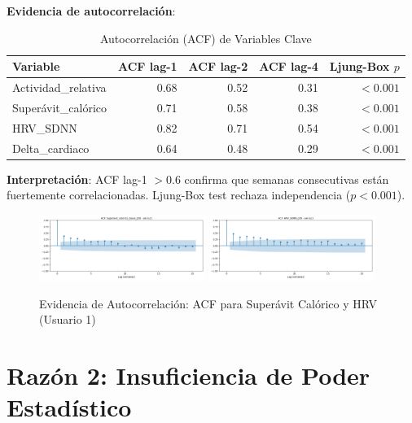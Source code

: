 \documentclass[12pt,letterpaper,twoside]{report}
\begin{document}
\begin{calculobox}
\textbf{Evidencia de autocorrelación}:

\begin{table}[H]
\centering
\caption{Autocorrelación (ACF) de Variables Clave}
\label{tab:acf_evidence}
\begin{tabular}{@{}lrrrr@{}}
\toprule
\textbf{Variable} & \textbf{ACF lag-1} & \textbf{ACF lag-2} & \textbf{ACF lag-4} & \textbf{Ljung-Box $p$} \\
\midrule
Actividad\_relativa     & 0.68 & 0.52 & 0.31 & $< 0.001$ \\
Superávit\_calórico     & 0.71 & 0.58 & 0.38 & $< 0.001$ \\
HRV\_SDNN               & 0.82 & 0.71 & 0.54 & $< 0.001$ \\
Delta\_cardiaco         & 0.64 & 0.48 & 0.29 & $< 0.001$ \\
\bottomrule
\end{tabular}
\end{table}

\textbf{Interpretación}: ACF lag-1 $> 0.6$ confirma que semanas consecutivas están fuertemente correlacionadas. Ljung-Box test rechaza independencia ($p<0.001$).
\end{calculobox}

\begin{figure}[H]
\centering
\includegraphics[width=0.48\textwidth]{figuras/acf_Superavit_calorico_basal_p50_u1.png}
\includegraphics[width=0.48\textwidth]{figuras/acf_HRV_SDNN_p50_u1.png}
\caption{Evidencia de Autocorrelación: ACF para Superávit Calórico y HRV (Usuario 1)}
\label{fig:acf_evidence}
\end{figure}

\section{Razón 2: Insuficiencia de Poder Estadístico}
\end{document}
